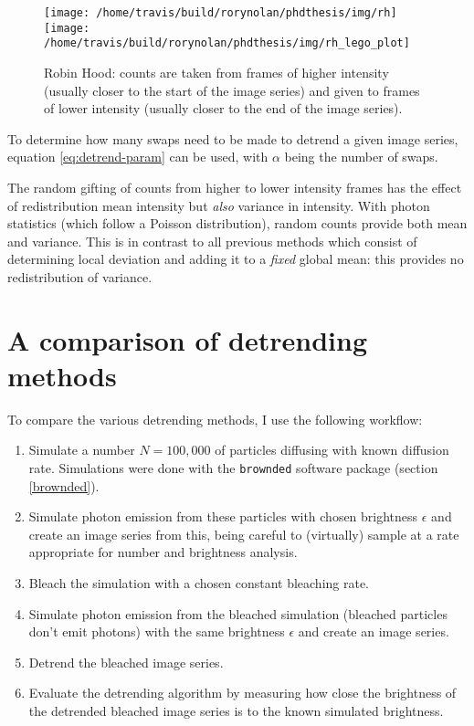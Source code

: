 \documentclass[12pt,]{book}
\providecommand{\tightlist}{%
  \setlength{\itemsep}{0pt}\setlength{\parskip}{0pt}}
\theoremstyle{definition}
\theoremstyle{definition}
\theoremstyle{definition}
\theoremstyle{remark}
\begin{document}
\begin{figure}

\texttt{[image: /home/travis/build/rorynolan/phdthesis/img/rh]} \texttt{[image: /home/travis/build/rorynolan/phdthesis/img/rh\_lego\_plot]} \hfill{}

\caption{Robin Hood: counts are taken from frames of higher
intensity (usually closer to the start of the image series) and given to
frames of lower intensity (usually closer to the end of the image
series).}\label{fig:rh-lego}
\end{figure}

To determine how many swaps need to be made to detrend a given image
series, equation \eqref{eq:detrend-param} can be used, with \(\alpha\)
being the number of swaps.

The random gifting of counts from higher to lower intensity frames has
the effect of redistribution mean intensity but \emph{also} variance in
intensity. With photon statistics (which follow a Poisson distribution),
random counts provide both mean and variance. This is in contrast to all
previous methods which consist of determining local deviation and adding
it to a \emph{fixed} global mean: this provides no redistribution of
variance.

\section{A comparison of detrending methods}\label{detrend-compare}

To compare the various detrending methods, I use the following workflow:

\begin{enumerate}
\def\labelenumi{\arabic{enumi}.}
\tightlist
\item
  Simulate a number \(N = 100,000\) of particles diffusing with known
  diffusion rate. Simulations were done with the \texttt{brownded}
  software package (section \ref{brownded}).
\item
  Simulate photon emission from these particles with chosen brightness
  \(\epsilon\) and create an image series from this, being careful to
  (virtually) sample at a rate appropriate for number and brightness
  analysis.
\item
  Bleach the simulation with a chosen constant bleaching rate.
\item
  Simulate photon emission from the bleached simulation (bleached
  particles don't emit photons) with the same brightness \(\epsilon\)
  and create an image series.
\item
  Detrend the bleached image series.
\item
  Evaluate the detrending algorithm by measuring how close the
  brightness of the detrended bleached image series is to the known
  simulated brightness.
\end{enumerate}
\end{document}
